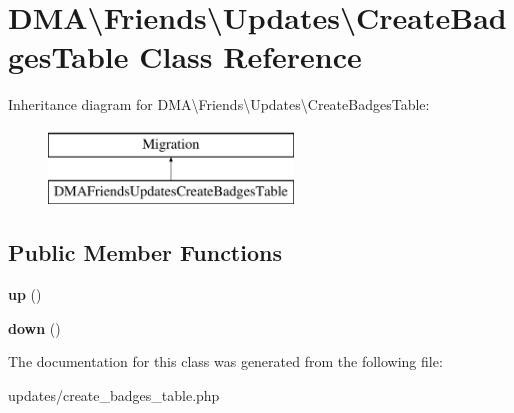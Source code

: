 \hypertarget{classDMA_1_1Friends_1_1Updates_1_1CreateBadgesTable}{\section{D\-M\-A\textbackslash{}Friends\textbackslash{}Updates\textbackslash{}Create\-Badges\-Table Class Reference}
\label{classDMA_1_1Friends_1_1Updates_1_1CreateBadgesTable}
}
Inheritance diagram for D\-M\-A\textbackslash{}Friends\textbackslash{}Updates\textbackslash{}Create\-Badges\-Table\-:\begin{figure}[H]
\begin{center}
\leavevmode
\includegraphics[height=2.000000cm]{da/d43/classDMA_1_1Friends_1_1Updates_1_1CreateBadgesTable}
\end{center}
\end{figure}
\subsection*{Public Member Functions}
\begin{DoxyCompactItemize}
\item 
\hypertarget{classDMA_1_1Friends_1_1Updates_1_1CreateBadgesTable_aa2a7d5200858b224ff085641a59db353}{{\bfseries up} ()}\label{classDMA_1_1Friends_1_1Updates_1_1CreateBadgesTable_aa2a7d5200858b224ff085641a59db353}

\item 
\hypertarget{classDMA_1_1Friends_1_1Updates_1_1CreateBadgesTable_a0f17511a19b47c484e071fed09566d7e}{{\bfseries down} ()}\label{classDMA_1_1Friends_1_1Updates_1_1CreateBadgesTable_a0f17511a19b47c484e071fed09566d7e}

\end{DoxyCompactItemize}


The documentation for this class was generated from the following file\-:\begin{DoxyCompactItemize}
\item 
updates/create\-\_\-badges\-\_\-table.\-php\end{DoxyCompactItemize}

